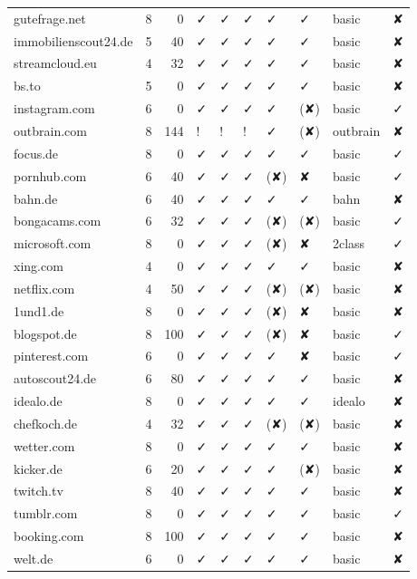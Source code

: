 {\begin{longtable}{lrrlllllll}
		gutefrage.net & 8     & 0     & ✓ & ✓ & ✓ & ✓ & ✓ & basic & ✘\\
		immobilienscout24.de & 5     & 40    & ✓ & ✓ & ✓ & ✓ & ✓ & basic & ✘\\
		streamcloud.eu & 4     & 32    & ✓ & ✓ & ✓ & ✓ & ✓ & basic & ✘\\
		bs.to & 5     & 0     & ✓ & ✓ & ✓ & ✓ & ✓ & basic & ✘\\
		instagram.com & 6     & 0     & ✓ & ✓ & ✓ & ✓ & (✘) & basic & ✓\\
		outbrain.com & 8     & 144   & ! & ! & ! & ✓ & (✘) & outbrain & ✘\\
		focus.de & 8     & 0     & ✓ & ✓ & ✓ & ✓ & ✓ & basic & ✓\\
		pornhub.com & 6     & 40    & ✓ & ✓ & ✓ & (✘) & ✘ & basic & ✓\\
		bahn.de & 6     & 40    & ✓ & ✓ & ✓ & ✓ & ✓ & bahn  & ✘\\
		bongacams.com & 6     & 32    & ✓ & ✓ & ✓ & (✘) & (✘) & basic & ✓\\
		microsoft.com & 8     & 0     & ✓ & ✓ & ✓ & (✘) & ✘ & 2class & ✓\\
		xing.com & 4     & 0     & ✓ & ✓ & ✓ & ✓ & ✓ & basic & ✘\\
		netflix.com & 4     & 50    & ✓ & ✓ & ✓ & (✘) & (✘) & basic & ✘\\
		1und1.de & 8     & 0     & ✓ & ✓ & ✓ & (✘) & ✘ & basic & ✘\\
		blogspot.de & 8     & 100   & ✓ & ✓ & ✓ & (✘) & ✘ & basic & ✓\\
		pinterest.com & 6     & 0     & ✓ & ✓ & ✓ & ✓ & ✘ & basic & ✓\\
		autoscout24.de & 6     & 80    & ✓ & ✓ & ✓ & ✓ & ✓ & basic & ✘\\
		idealo.de & 8     & 0     & ✓ & ✓ & ✓ & ✓ & ✓ & idealo & ✘\\
		chefkoch.de & 4     & 32    & ✓ & ✓ & ✓ & (✘) & (✘) & basic & ✘\\
		wetter.com & 8     & 0     & ✓ & ✓ & ✓ & ✓ & ✓ & basic & ✘\\
		kicker.de & 6     & 20    & ✓ & ✓ & ✓ & ✓ & (✘) & basic & ✘\\
		twitch.tv & 8     & 40    & ✓ & ✓ & ✓ & ✓ & ✓ & basic & ✘\\
		tumblr.com & 8     & 0     & ✓ & ✓ & ✓ & ✓ & ✓ & basic & ✓\\
		booking.com & 8     & 100   & ✓ & ✓ & ✓ & ✓ & ✓ & basic & ✘\\
		welt.de & 6     & 0     & ✓ & ✓ & ✓ & ✓ & ✓ & basic & ✘\\

\end{longtable}}
